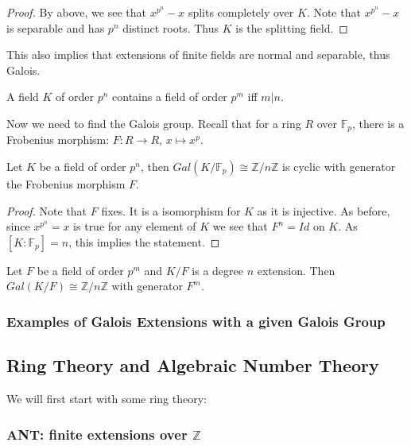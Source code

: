 \documentclass[main.tex]{subfiles}
\begin{document}
\begin{proof}
By above, we see that $x^{p^n} -x$ splits completely over $K$. Note that $x^{p^n} -x$ is separable and has $p^n$ distinct roots. Thus $K$ is the splitting field.
\end{proof}

This also implies that extensions of finite fields are normal and separable, thus Galois.

A field $K$ of order $p^n$ contains a field of order $p^m$ iff $m | n$. 

Now we need to find the Galois group. Recall that for a ring $R$ over $\mathbb{F}_p$, there is a Frobenius morphism: $F : R \rightarrow R$, $x \mapsto x^p$.

\begin{theorem}
Let $K$ be a field of order $p^n$, then $Gal(K/\mathbb{F}_p) \cong \mathbb{Z}/n\mathbb{Z}$ is cyclic with generator the Frobenius morphism $F$.
\end{theorem}

\begin{proof}
Note that $F$ fixes. It is a isomorphism for $K$ as it is injective. As before, since $x^{p^n} = x$ is true for any element of $K$ we see that $F^n = Id$ on $K$. As $[K : \mathbb{F}_p] = n$, this implies the statement.
\end{proof}

\begin{corollary}
Let $F$ be a field of order $p^m$ and $K/F$ is a degree $n$ extension. Then $Gal(K/F) \cong \mathbb{Z}/n\mathbb{Z}$ with generator $F^m$. 
\end{corollary}


\subsubsection{Examples of Galois Extensions with a given Galois Group}


\subsection{Ring Theory and Algebraic Number Theory}

We will first start with some ring theory:


\subsubsection{ANT: finite extensions over $\mathbb{Z}$}
\end{document}
